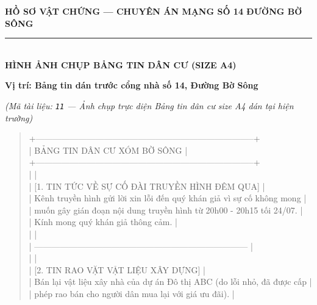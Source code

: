 \documentclass[12pt,a4paper]{article}
\begin{document}
\begin{center}
    \fontsize{11pt}{13pt}\selectfont
    \textbf{HỒ SƠ VẬT CHỨNG — CHUYÊN ÁN MẠNG SỐ 14 ĐƯỜNG BỜ SÔNG}\\[-0.2em]
    \rule{6cm}{0.6pt}\\[0.5cm]
    \textbf{\Large  HÌNH ẢNH CHỤP BẢNG TIN DÂN CƯ (SIZE A4)}\\[0.15cm]
    \textit{}
\end{center}
\vspace{0.3cm}
\textbf{Vị trí: Bảng tin dán trước cổng nhà số 14, Đường Bờ Sông}

\textit{(Mã tài liệu: \texttt{11} — Ảnh chụp trực diện Bảng tin dân cư size A4 dán tại hiện trường)}




\begin{quote}
\fontsize{9pt}{11pt}\selectfont\ttfamily
+-----------------------------------------------------------------------------+\\
|                       BẢNG TIN DÂN CƯ XÓM BỜ SÔNG                           |\\
+-----------------------------------------------------------------------------+\\
|                                                                             |\\
| [1. TIN TỨC VỀ SỰ CỐ ĐÀI TRUYỀN HÌNH ĐÊM QUA]                               |\\
| Kênh truyền hình gửi lời xin lỗi đến quý khán giả vì sự cố không mong       |\\
| muốn gây gián đoạn nội dung truyền hình từ 20h00 - 20h15 tối 24/07.         |\\
| Kính mong quý khán giả thông cảm.                                           |\\
|                                                                             |\\
| --------------------------------------------------------------------------- |\\
|                                                                             |\\
| [2. TIN RAO VẶT VẬT LIỆU XÂY DỰNG]                                          |\\
| Bán lại vật liệu xây nhà của dự án Đô thị ABC (do lỗi nhỏ, đã được cấp     |\\
| phép rao bán cho người dân mua lại với giá ưu đãi).                         |\\

\end{quote}
\end{document}
